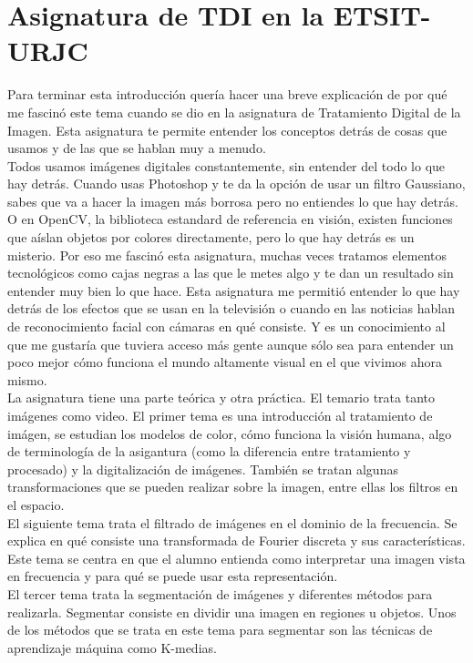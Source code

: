 \section{Asignatura de TDI en la ETSIT-URJC}

Para terminar esta introducción quería hacer una breve explicación de por qué me fascinó este tema cuando se dio en la asignatura de Tratamiento Digital de la Imagen. Esta asignatura te permite entender los conceptos detrás de cosas que usamos y de las que se hablan muy a menudo.\\

Todos usamos imágenes digitales constantemente, sin entender del todo lo que hay detrás. Cuando usas Photoshop y te da la opción de usar un filtro Gaussiano, sabes que va a hacer la imagen más borrosa pero no entiendes lo que hay detrás. O en OpenCV, la biblioteca estandard de referencia en visión, existen funciones que aíslan objetos por colores directamente, pero lo que hay detrás es un misterio. Por eso me fascinó esta asignatura, muchas veces tratamos elementos tecnológicos como cajas negras a las que le metes algo y te dan un resultado sin entender muy bien lo que hace. Esta asignatura me permitió entender lo que hay detrás de los efectos que se usan en la televisión o cuando en las noticias hablan de reconocimiento facial con cámaras en qué consiste. Y es un conocimiento al que me gustaría que tuviera acceso más gente aunque sólo sea para entender un poco mejor cómo funciona el mundo altamente visual en el que vivimos ahora mismo.\\

La asignatura tiene una parte teórica y otra práctica. El temario trata tanto imágenes como video. El primer tema es una introducción al tratamiento de imágen, se estudian los modelos de color, cómo funciona la visión humana, algo de terminología de la asigantura (como la diferencia entre tratamiento y procesado) y la digitalización de imágenes. También se tratan algunas transformaciones que se pueden realizar sobre la imagen, entre ellas los filtros en el espacio.\\

El siguiente tema trata el filtrado de imágenes en el dominio de la frecuencia. Se explica en qué consiste una transformada de Fourier discreta y sus características. Este tema se centra en que el alumno entienda como interpretar una imagen vista en frecuencia y para qué se puede usar esta representación.\\

El tercer tema trata la segmentación de imágenes y diferentes métodos para realizarla. Segmentar consiste en dividir una imagen en regiones u objetos. Unos de los métodos que se trata en este tema para segmentar son las técnicas de aprendizaje máquina como K-medias.\\

